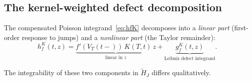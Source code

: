 \documentclass[11pt,a4paper]{article}
\theoremstyle{plain}
\theoremstyle{definition}
\theoremstyle{remark}
\begin{document}
\subsection{The kernel-weighted defect decomposition}

The compensated Poisson integrand~\eqref{eq:hfK} decomposes into
a \emph{linear part} (first-order response to jumps) and a
\emph{nonlinear part} (the Taylor remainder):
\begin{equation}\label{eq:hfK-decomp}
  h_f^K(t,z)
  = \underbrace{f'(V_T(t\!-\!))\,K(T,t)\,z}_{\text{linear in }z}
  + \underbrace{g_f^K(t,z)}_{\text{Leibniz defect integrand}}.
\end{equation}

The integrability of these two components in $\widetilde{H}_J$
differs qualitatively.
\end{document}
